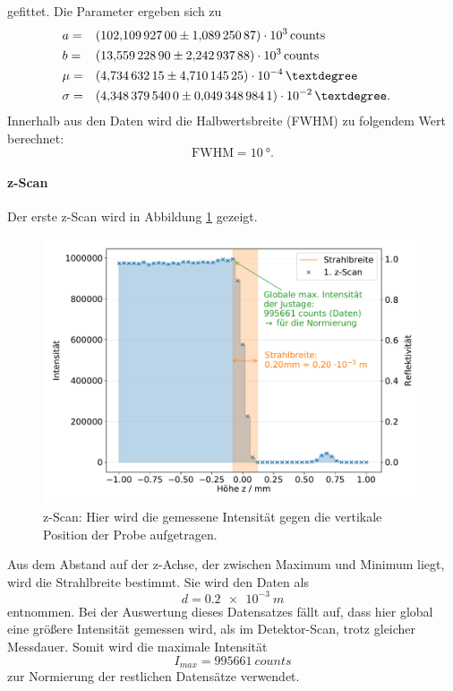 gefittet.
Die Parameter ergeben sich zu
\begin{align*}
	& a	       = && \SI{102.109927 \pm 1.08925087 e+03}{counts} && \\
	& b	       = && \SI{13.5592289 \pm 2.24293788 e+03}{counts} && \\
	& \mu 	   = && \SI{4.73463215 \pm 4.71014525 e-04}{°}      && \\
	& \sigma   = && \SI{4.34837954 \pm 0.0493489841 e-02}{°}.   && \\
\end{align*}
Innerhalb aus den Daten wird die Halbwertsbreite (FWHM) zu folgendem Wert berechnet:
\begin{equation*}
	\text{FWHM} = \SI{10}{°}.
\end{equation*}


\FloatBarrier
\paragraph{z-Scan}
Der erste z-Scan wird in Abbildung \ref{fig:z} gezeigt.
\begin{figure}[H]
  \centering
  \includegraphics[width=\textwidth]{content/images/done_plot_zscan.pdf}
  \caption{z-Scan: Hier wird die gemessene Intensität gegen die vertikale Position der Probe aufgetragen.}
  \label{fig:z}
\end{figure}
Aus dem Abstand auf der z-Achse, der zwischen Maximum und Minimum liegt, wird die Strahlbreite bestimmt.
Sie wird den Daten als
\begin{equation*}
	d = \SI{0.2e-3}{m}
\end{equation*}
entnommen.
Bei der Auswertung dieses Datensatzes fällt auf, dass hier global eine größere Intensität gemessen wird, als im Detektor-Scan, trotz gleicher Messdauer.
Somit wird die maximale Intensität
\begin{equation*}
	I_{max} = \SI{995661}{counts}
\end{equation*}
zur Normierung der restlichen Datensätze verwendet.

